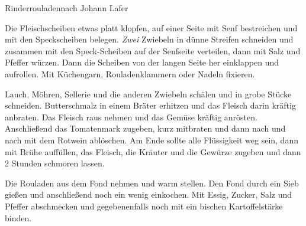\begin{recipe}{Rinderrouladen}{nach Johann Lafer}
  \label{Rinderrouladen}
  \inglist

  \steps

  Die Fleischscheiben etwas platt klopfen, auf einer Seite mit Senf bestreichen
  und mit den Speckscheiben belegen. \emph{Zwei} Zwiebeln in dünne Streifen
  schneiden und zusammen mit den Speck-Scheiben auf der Senfseite verteilen,
  dann mit Salz und Pfeffer würzen. Dann die Scheiben von der langen Seite her
  einklappen und aufrollen. Mit Küchengarn, Rouladenklammern oder Nadeln
  fixieren.

  Lauch, Möhren, Sellerie und die anderen Zwiebeln schälen und in grobe Stücke
  schneiden. Butterschmalz in einem Bräter erhitzen und das Fleisch darin
  kräftig anbraten. Das Fleisch raus nehmen und das Gemüse kräftig anrösten.
  Anschließend das Tomatenmark zugeben, kurz mitbraten und dann nach und nach
  mit dem Rotwein ablöschen. Am Ende sollte alle Flüssigkeit weg sein, dann mit
  Brühe auffüllen, das Fleisch, die Kräuter und die Gewürze zugeben und dann 2
  Stunden schmoren lassen.

  Die Rouladen aus dem Fond nehmen und warm stellen. Den Fond durch ein Sieb
  gießen und anschließend noch ein wenig einkochen. Mit Essig, Zucker, Salz und
  Pfeffer abschmecken und gegebenenfalls noch mit ein bischen Kartoffelstärke
  binden.
\end{recipe}
